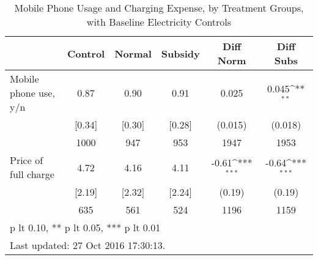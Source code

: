 \begin{table}[htbp]\centering
\def\sym#1{\ifmmode^{#1}\else\(^{#1}\)\fi}
\caption{Mobile Phone Usage and Charging Expense, by Treatment Groups, with Baseline Electricity Controls \label{tab:"balance"}}
\begin{tabular*}{0.9\hsize}{@{\hskip\tabcolsep\extracolsep\fill}l*{1}{ccccc}}
\toprule
                                &  Control&   Normal&  Subsidy&Diff Norm         &Diff Subs         \\
\midrule
Mobile phone use, y/n           &     0.87&     0.90&     0.91&    0.025         &    0.045\sym{**} \\
                                &   [0.34]&   [0.30]&   [0.28]&  (0.015)         &  (0.018)         \\
                                &     1000&      947&      953&     1947         &     1953         \\
Price of full charge            &     4.72&     4.16&     4.11&    -0.61\sym{***}&    -0.64\sym{***}\\
                                &   [2.19]&   [2.32]&   [2.24]&   (0.19)         &   (0.19)         \\
                                &      635&      561&      524&     1196         &     1159         \\
\bottomrule
\multicolumn{6}{l}{\footnotesize * p lt 0.10, ** p lt 0.05, *** p lt 0.01}\\
\multicolumn{6}{l}{\footnotesize Last updated: 27 Oct 2016 17:30:13.}\\
\end{tabular*}
\end{table}
